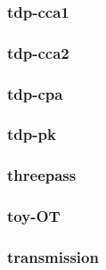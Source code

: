 \begin{frame}\frametitle{tdp-cca1}
\begin{figure}
\begin{center}

\end{center}
\end{figure}
\end{frame}
\begin{frame}\frametitle{tdp-cca2}
\begin{figure}
\begin{center}

\end{center}
\end{figure}
\end{frame}
\begin{frame}\frametitle{tdp-cpa}
\begin{figure}
\begin{center}

\end{center}
\end{figure}
\end{frame}
\begin{frame}\frametitle{tdp-pk}
\begin{figure}
\begin{center}

\end{center}
\end{figure}
\end{frame}
\begin{frame}\frametitle{threepass}
\begin{figure}
\begin{center}

\end{center}
\end{figure}
\end{frame}
\begin{frame}\frametitle{toy-OT}
\begin{figure}
\begin{center}

\end{center}
\end{figure}
\end{frame}
\begin{frame}\frametitle{transmission}
\begin{figure}
\begin{center}

\end{center}
\end{figure}
\end{frame}
